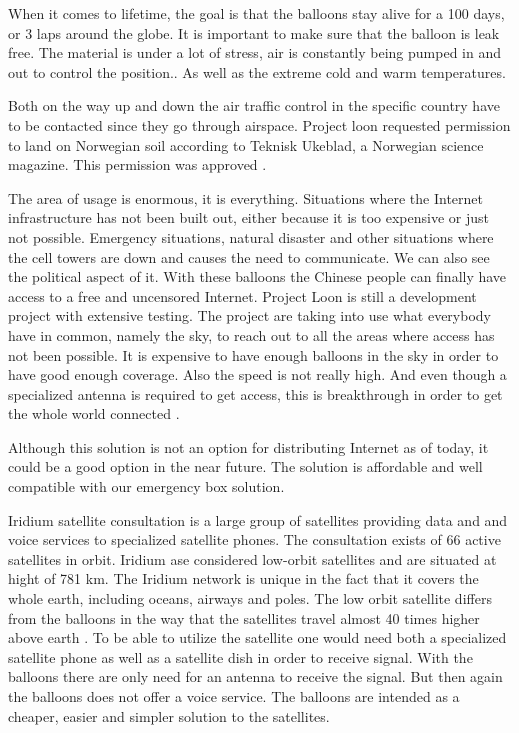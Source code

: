 When it comes to lifetime, the goal is that the balloons stay alive for a 100 days, or 3 laps around the globe. It is important to make sure that the balloon is leak free. The material is under a lot of stress, air is constantly being pumped in and out to control the position.. As well as the extreme cold and warm temperatures. 

Both on the way up and down the air traffic control in the specific country have to be contacted since they go through airspace. Project loon requested permission to land on Norwegian soil according to Teknisk Ukeblad, a Norwegian science magazine. This permission was approved \cite{loonTU}.

The area of usage is enormous, it is everything. Situations where the Internet infrastructure has not been built out, either because it is too expensive or just not possible. Emergency situations, natural disaster and other situations where the cell towers are down and causes the need to communicate. We can also see the political aspect of it. With these balloons the Chinese people can finally have access to a free and uncensored Internet. Project Loon is still a development project with extensive testing. The project are taking into use what everybody have in common, namely the sky, to reach out to all the areas where access has not been possible. It is expensive to have enough balloons in the sky in order to have good enough coverage. Also the speed is not really high. And even though a specialized antenna is required to get access, this is breakthrough in order to get the whole world connected \cite{loonYouTube, loonNorsk}.

Although this solution is not an option for distributing Internet as of today, it could be a good option in the near future. The solution is affordable and well compatible with our emergency box solution.

Iridium satellite consultation is a large group of satellites providing data and and voice services to specialized satellite phones. The consultation exists of 66 active satellites in orbit. Iridium ase considered low-orbit satellites and are situated at hight of 781 km. The Iridium network is unique in the fact that it covers the whole earth, including oceans, airways and poles. The low orbit satellite differs from the balloons in the way that the satellites travel almost 40 times higher above earth \cite{iridium}. To be able to utilize the satellite one would need both a specialized satellite phone as well as a satellite dish in order to receive signal. With the balloons there are only need for an antenna to receive the signal. But then again the balloons does not offer a voice service. The balloons are intended as a cheaper, easier and simpler solution to the satellites.                                         

